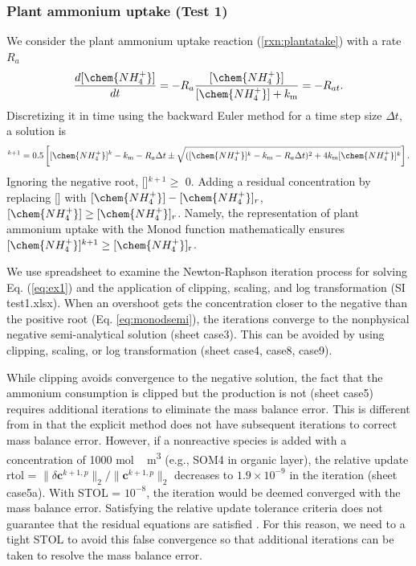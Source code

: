 \documentclass[gmd, manuscript]{copernicus}
\begin{document}
\subsubsection{Plant ammonium uptake (Test 1)}
We consider the plant ammonium uptake reaction (\ref{rxn:plantatake}) with a
rate $R_a$
\begin{equation}
\frac{d[\chem{NH_4^+}]}{dt} =- R_a \frac{[\chem{NH_4^+}]}{[\chem{NH_4^+}]+k_\text{m}} = -R_{at}.
\label{eq:ex1}
\end{equation}
Discretizing it in
time using the backward Euler method for a time step size $\Delta t$, a solution is
\begin{equation}
[\chem{NH_4^+}]^{k+1}=0.5 \left[[\chem{NH_4^+}]^k - k_\text{m} - R_a \Delta t
\pm \sqrt{([\chem{NH_4^+}]^k - k_\text{m} - R_a\Delta t)^2 + 4
k_\text{m}[\chem{NH_4^+}]^k}\right].
\label{eq:monodsemi}
\end{equation}
Ignoring the negative root, []$^{k+1}\geq$
0. Adding a residual concentration by replacing [] with $[\chem{NH_4^+}]-[\chem{NH_4^+}]_r$, $[\chem{NH_4^+}]\geq[\chem{NH_4^+}]_r$. Namely, the representation of plant ammonium uptake with the Monod function mathematically ensures $[\chem{NH_4^+}]^{k+1} \geq [\chem{NH_4^+}]_\text{r}$. 

We use spreadsheet to examine the Newton-Raphson iteration process for solving Eq. (\ref{eq:ex1}) and the application of clipping, scaling, and log transformation (SI test1.xlsx). 
When an overshoot gets the concentration closer to the negative than the positive root (Eq. \ref{eq:monodsemi}), the iterations converge to the nonphysical negative semi-analytical solution (sheet case3). This can be avoided by using clipping, scaling, or log transformation (sheet case4, case8, case9). 

While clipping avoids convergence to the negative solution, the fact that the ammonium consumption is clipped but the  production is not (sheet case5) requires additional iterations to eliminate the mass balance error. This is different from \citet{Tang2015} in that the explicit method does not have subsequent iterations to correct mass balance error. However, if a nonreactive species is added with a concentration of 1000 \unit{mol\,m^3} (e.g., SOM4 in organic layer), the relative update rtol = ${\|\delta \mathbf{c}^{k+1,p}\|_2}/{\|\mathbf{c}^{k+1,p} \|_2}$ decreases to $1.9\times 10^{-9}$ in the iteration (sheet case5a). With STOL = $10^{-8}$, the iteration would be deemed converged with the mass balance error. Satisfying the relative update tolerance criteria does not guarantee that the residual equations are satisfied \citep{Lichtner2015}. For this reason, we need to a tight STOL to avoid this false convergence so that additional iterations can be taken to resolve the mass balance error. 
 
\end{document}
